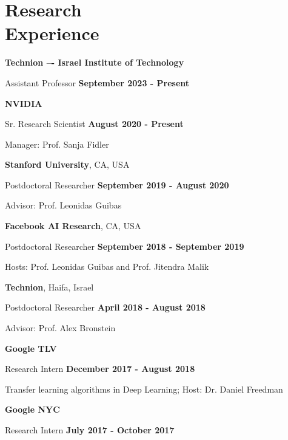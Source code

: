 \documentclass[margin,line]{res}
\newenvironment{list1}{
  \begin{list}{\ding{113}}{%
      \setlength{\itemsep}{0in}
      \setlength{\parsep}{0in} \setlength{\parskip}{0in}
      \setlength{\topsep}{0in} \setlength{\partopsep}{0in}
      \setlength{\leftmargin}{0.17in}}}{\end{list}}
\begin{document}
\begin{resume}
\begin{list1}
\end{list1}

\section{\sc Research \\ Experience}

{\bf Technion –- Israel Institute of Technology} 

\vspace{-.3cm}
{Assistant Professor}
\hfill {\bf September 2023 - Present}

{\bf NVIDIA}

\vspace{-.3cm}
{Sr. Research Scientist} \hfill {\bf August 2020 - Present}

\vspace{-.3cm}
{Manager: Prof. Sanja Fidler}

{\bf Stanford University}, CA, USA

\vspace{-.3cm}
{Postdoctoral Researcher} \hfill {\bf September 2019 - August 2020}

\vspace{-.3cm}
{Advisor: Prof. Leonidas Guibas}


{\bf Facebook AI Research}, CA, USA

\vspace{-.3cm}
{Postdoctoral Researcher} \hfill {\bf September 2018 - September 2019}

\vspace{-.3cm}
{Hosts: Prof. Leonidas Guibas and Prof. Jitendra Malik}

{\bf Technion}, Haifa, Israel 

\vspace{-.3cm}
{Postdoctoral Researcher} \hfill {\bf April 2018 - August 2018}

\vspace{-.3cm}
{Advisor: Prof. Alex Bronstein}

{\bf Google TLV} 

\vspace{-.3cm}
{Research Intern} \hfill {\bf December 2017 - August 2018}

\vspace{-.3cm}
{Transfer learning algorithms in Deep Learning; Host: Dr. Daniel Freedman}

{\bf Google NYC} 

\vspace{-.3cm}
{Research Intern} \hfill {\bf July 2017 - October 2017}


\end{resume}
\end{document}
